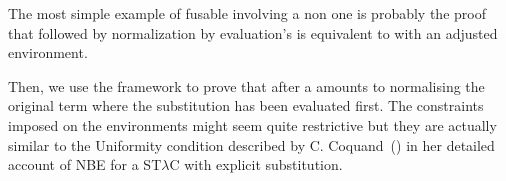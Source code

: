 The most simple example of fusable  involving a non 
one is probably the proof that  followed by normalization by evaluation's
 is equivalent to  with an adjusted environment.


Then, we use the framework to prove that  after a 
amounts to normalising the original term where the substitution has been
evaluated first. The constraints imposed on the environments might seem
quite restrictive but they are actually similar to the Uniformity condition
described by C. Coquand~(\citeyear{coquand2002formalised}) in her detailed
account of NBE for a ST$λ$C with explicit substitution.
